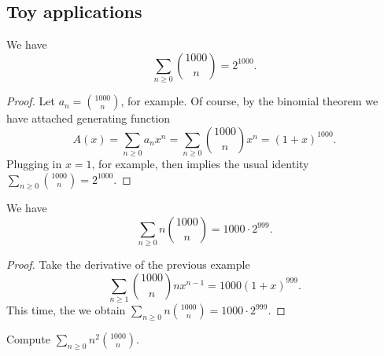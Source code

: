 \documentclass[11pt]{scrartcl}
\begin{document}
\subsection{Toy applications}
\begin{example}
	We have 
	\[ \sum_{n \ge 0} \binom{1000}{n} = 2^{1000}. \]
\end{example}
\begin{proof}
	Let $a_n = \binom{1000}{n}$, for example.
	Of course, by the binomial theorem we have attached generating function
	\[ A(x) = \sum_{n \ge 0} a_n x^n 
		= \sum_{n \ge 0} \binom{1000}{n} x^n
		= (1+x)^{1000}. \]
	Plugging in $x=1$, for example, then implies the usual identity
	$\sum_{n \ge 0} \binom{1000}{n} = 2^{1000}$.
\end{proof}
\begin{example}
	We have
	\[ \sum_{n \ge 0} n\binom{1000}{n} = 1000 \cdot 2^{999}. \]
\end{example}
\begin{proof}
	Take the derivative of the previous example
	\[ \sum_{n \ge 1} \binom{1000}{n} n x^{n-1}
		= 1000 (1+x)^{999}. \]
	This time, the we obtain 
	$\sum_{n \ge 0} n \binom{1000}{n} = 1000 \cdot 2^{999}$.
\end{proof}
\begin{exercise}
	Compute $\sum_{n \ge 0} n^2\binom{1000}{n}$. %
\end{exercise}
\end{document}
